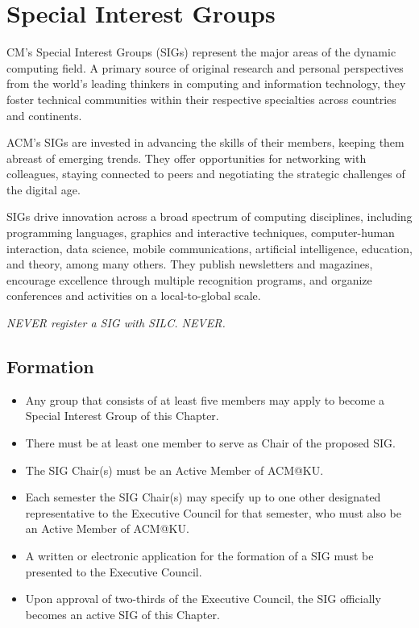 %
%
\let\textcircled=\pgftextcircled
\chapter{Special Interest Groups}
\label{chap:SIGs}

CM's Special Interest Groups (SIGs) represent the major areas of the
dynamic computing field.  A primary source of original research and personal
perspectives from the world's leading thinkers in computing and information
technology, they foster technical communities within their respective
specialties across countries and continents.

ACM's SIGs are invested in advancing the skills of their members, keeping them
abreast of emerging trends. They offer opportunities for networking with
colleagues, staying connected to peers and negotiating the strategic challenges
of the digital age.

SIGs drive innovation across a broad spectrum of computing disciplines,
including programming languages, graphics and interactive techniques,
computer-human interaction, data science, mobile communications, artificial
intelligence, education, and theory, among many others. They publish newsletters
and magazines, encourage excellence through multiple recognition programs, and
organize conferences and activities on a local-to-global scale.

\textit{NEVER register a SIG with SILC. NEVER.}

\section{Formation}
\begin{itemize}
  \item Any group that consists of at least five members may apply to become a
        Special Interest Group of this Chapter.
  \item There must be at least one member to serve as Chair of the proposed SIG.
  \item The SIG Chair(s) must be an Active Member of ACM@KU.
  \item Each semester the SIG Chair(s) may specify up to one other designated
        representative to the Executive Council for that semester, who must also
        be an Active Member of ACM@KU.
  \item A written or electronic application for the formation of a SIG must be
        presented to the Executive Council.
  \item Upon approval of two-thirds of the Executive Council, the SIG officially
        becomes an active SIG of this Chapter.
\end{itemize}
